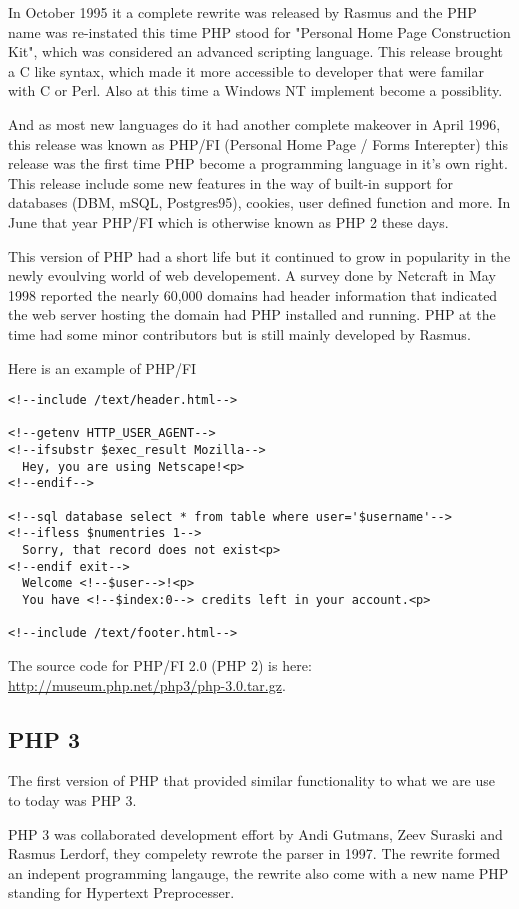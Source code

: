 \documentclass{book}
\begin{document}
In October 1995 it a complete rewrite was released by Rasmus and the PHP name was re-instated this time PHP stood for "Personal Home Page Construction Kit", which was considered an advanced scripting language. This release brought a C like syntax, which made it more accessible to developer that were familar with C or Perl. Also at this time a Windows NT implement become a possiblity.

And as most new languages do it had another complete makeover in April 1996, this release was known as PHP/FI (Personal Home Page / Forms Interepter) this release was the first time PHP become a programming language in it's own right. This release include some new features in the way of built-in support for databases (DBM, mSQL, Postgres95), cookies, user defined function and more. In June that year PHP/FI which is otherwise known as PHP 2 these days.

This version of PHP had a short life but it continued to grow in popularity in the newly evoulving world of web developement. A survey done by Netcraft in May 1998 reported the nearly 60,000 domains had header information that indicated the web server hosting the domain had PHP installed and running. PHP at the time had some minor contributors but is still mainly developed by Rasmus. 

\newpage
Here is an example of PHP/FI
\lstset{language=HTML}
\begin{lstlisting}[frame=single]
<!--include /text/header.html-->

<!--getenv HTTP_USER_AGENT-->
<!--ifsubstr $exec_result Mozilla-->
  Hey, you are using Netscape!<p>
<!--endif-->

<!--sql database select * from table where user='$username'-->
<!--ifless $numentries 1-->
  Sorry, that record does not exist<p>
<!--endif exit-->
  Welcome <!--$user-->!<p>
  You have <!--$index:0--> credits left in your account.<p>

<!--include /text/footer.html-->
\end{lstlisting}
The source code for PHP/FI 2.0 (PHP 2) is here: \href{http://museum.php.net/php2/php-2.0.tar.gz}{http://museum.php.net/php3/php-3.0.tar.gz}.


\subsection{PHP 3}
The first version of PHP that provided similar functionality to what we are use to today was PHP 3.

PHP 3 was collaborated development effort by Andi Gutmans, Zeev Suraski and Rasmus Lerdorf, they compelety rewrote the parser in 1997. The rewrite formed an indepent programming langauge, the rewrite also come with a new name PHP standing for Hypertext Preprocesser.
\end{document}
